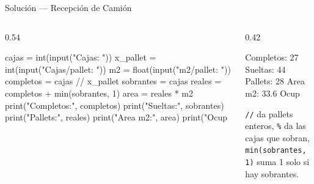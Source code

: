 \documentclass[aspectratio=169, 11pt]{beamer}
\begin{document}
\begin{frame}[fragile,shrink=15]{Solución --- Recepción de Camión}
  \vspace{-6pt}
  \begin{columns}[T]
    \begin{column}{0.54\textwidth}
      \begin{pyblock}
cajas = int(input("Cajas: "))
x_pallet = int(input("Cajas/pallet: "))
m2 = float(input("m2/pallet: "))
completos = cajas // x_pallet
sobrantes = cajas %
reales = completos + min(sobrantes, 1)
area = reales * m2
print("Completos:", completos)
print("Sueltas:", sobrantes)
print("Pallets:", reales)
print("Area m2:", area)
print("Ocup %
      \end{pyblock}
    \end{column}

    \begin{column}{0.42\textwidth}
      \begin{outputblock}
Completos: 27
Sueltas: 44
Pallets: 28
Area m2: 33.6
Ocup %
      \end{outputblock}

      \vspace{4pt}
      {\scriptsize\color{textMuted}
        \texttt{//} da pallets enteros,
        \texttt{\%} da las cajas que sobran,
        \texttt{min(sobrantes, 1)} suma 1
        solo si hay sobrantes.}
    \end{column}
  \end{columns}
\end{frame}
\end{document}
